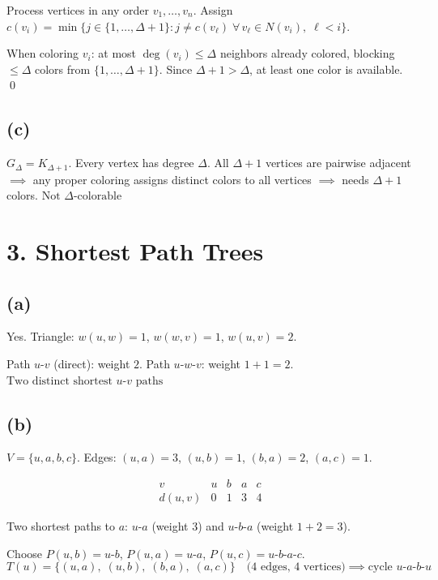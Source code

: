 \documentclass[11pt]{article}
\begin{document}
Process vertices in any order $v_1, \ldots, v_n$. Assign $c(v_i) = \min\{j \in \{1, \ldots, \Delta{+}1\} : j \ne c(v_\ell)\;\forall\, v_\ell \in N(v_i),\;\ell < i\}$.

When coloring $v_i$: at most $\deg(v_i) \le \Delta$ neighbors already colored, blocking $\le \Delta$ colors from $\{1, \ldots, \Delta{+}1\}$. Since $\Delta + 1 > \Delta$, at least one color is available. \qed

\subsection*{(c)}

$G_\Delta = K_{\Delta+1}$. Every vertex has degree $\Delta$. All $\Delta + 1$ vertices are pairwise adjacent $\implies$ any proper coloring assigns distinct colors to all vertices $\implies$ needs $\Delta + 1$ colors. $\boxed{\text{Not } \Delta\text{-colorable}}$


\newpage
\section*{3. Shortest Path Trees}

\subsection*{(a)}

Yes. Triangle: $w(u,w) = 1$, $w(w,v) = 1$, $w(u,v) = 2$.

Path $u$-$v$ (direct): weight $2$. \quad Path $u$-$w$-$v$: weight $1 + 1 = 2$. $\boxed{\text{Two distinct shortest } u\text{-}v \text{ paths}}$

\subsection*{(b)}

$V = \{u,a,b,c\}$. Edges: $(u,a)=3$, $(u,b)=1$, $(b,a)=2$, $(a,c)=1$.

\[
\begin{array}{c|cccc}
v & u & b & a & c \\ \hline
d(u,v) & 0 & 1 & 3 & 4
\end{array}
\]

Two shortest paths to $a$: $u$-$a$ (weight $3$) and $u$-$b$-$a$ (weight $1+2=3$).

Choose $P(u,b) = u$-$b$, \; $P(u,a) = u$-$a$, \; $P(u,c) = u$-$b$-$a$-$c$.
\[
T(u) = \{(u,a),\;(u,b),\;(b,a),\;(a,c)\} \quad\text{(4 edges, 4 vertices)} \implies \boxed{\text{cycle } u\text{-}a\text{-}b\text{-}u}
\]
\end{document}
